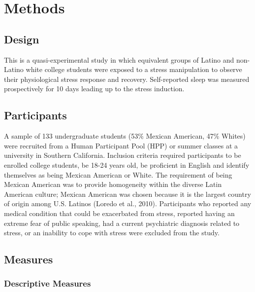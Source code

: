 \documentclass[
  man, fleqn, noextraspace]{apa6}
\begin{document}
\hypertarget{methods}{%
\section{Methods}\label{methods}}

\hypertarget{design}{%
\subsection{Design}\label{design}}

This is a quasi-experimental study in which equivalent groups of Latino and non-Latino white college students were exposed to a stress manipulation to observe their physiological stress response and recovery. Self-reported sleep was measured prospectively for 10 days leading up to the stress induction.

\hypertarget{participants}{%
\subsection{Participants}\label{participants}}

A sample of 133 undergraduate students (53\% Mexican American, 47\% Whites) were recruited from a Human Participant Pool (HPP) or summer classes at a university in Southern California. Inclusion criteria required participants to be enrolled college students, be 18-24 years old, be proficient in English and identify themselves as being Mexican American or White. The requirement of being Mexican American was to provide homogeneity within the diverse Latin American culture; Mexican American was chosen because it is the largest country of origin among U.S. Latinos (Loredo et al., 2010). Participants who reported any medical condition that could be exacerbated from stress, reported having an extreme fear of public speaking, had a current psychiatric diagnosis related to stress, or an inability to cope with stress were excluded from the study.

\hypertarget{measures}{%
\subsection{Measures}\label{measures}}

\hypertarget{descriptive-measures}{%
\subsubsection{Descriptive Measures}\label{descriptive-measures}}
\end{document}
